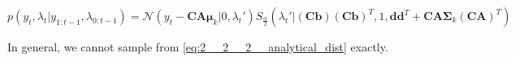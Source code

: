 \documentclass[../main.tex]{subfiles}
\begin{document}
\begin{equation}
    p(y_t, \lambda_t | y_{1:t-1}, \lambda_{0:t-1}) = \mathcal{N}(y_t - \mathbf{CA}\mathbf{\mu}_k | 0, \lambda_t')S_\frac{\alpha}{2}(\lambda_t' | (\mathbf{Cb})(\mathbf{Cb})^T, 1, \mathbf{dd}^T + \mathbf{CA\Sigma}_k(\mathbf{CA})^T)
    \label{eq:2__2__2__analytical_dist}
\end{equation}

In general, we cannot sample from \autoref{eq:2__2__2__analytical_dist} exactly. 
\end{document}
